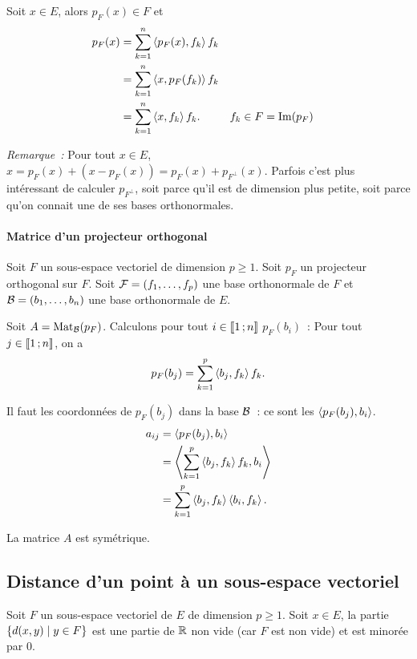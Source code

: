 Soit \(x \in E\), alors \(p_F(x) \in F\) et
\begin{align}
  p_F(x) &=\sum_{k=1}^n \left\langle{p_F(x)},{f_k}\right\rangle f_k \\
  &=\sum_{k=1}^n \left\langle{x},{p_F(f_k)}\right\rangle f_k \\
  &=\sum_{k=1}^n \left\langle{x},{f_k}\right\rangle f_k. && f_k \in F=\operatorname{Im}(p_F)
\end{align}

\emph{Remarque~:} Pour tout \(x \in E\), \(x = p_F(x) +(x-p_F(x)) = p_F(x) + p_{F^\perp}(x)\). Parfois c'est plus intéressant de calculer \(p_{F^\perp}\), soit parce qu'il est de dimension plus petite, soit parce qu'on connait une de ses bases orthonormales.

\paragraph{Matrice d'un projecteur orthogonal}
Soit \(F\) un sous-espace vectoriel de dimension \(p \geqslant 1\). Soit \(p_F\) un projecteur orthogonal sur \(F\). Soit \(\mathcal{F}=(f_1, \ldots, f_p)\) une base orthonormale de \(F\) et \(\mathcal{B}=(b_1, \ldots, b_n)\) une base orthonormale de \(E\).

Soit \(A=\mathrm{Mat}_{\mathcal{B}}(p_F)\). Calculons pour tout \(i \in \mathopen{\llbracket}1\mathclose{}\mathpunct{};n\mathclose{\rrbracket}\) \(p_F(b_i)\)~: Pour tout \(j \in \mathopen{\llbracket}1\mathclose{}\mathpunct{};n\mathclose{\rrbracket}\), on a
\begin{equation}
  p_F(b_j)=\sum_{k=1}^p \left\langle{b_j},{f_k}\right\rangle f_k.
\end{equation}

Il faut les coordonnées de \(p_F(b_j)\) dans la base \(\mathcal{B}\)~: ce sont les \(\left\langle{p_F(b_j)},{b_i}\right\rangle\).
\begin{align}
  a_{ij} &= \left\langle{p_F(b_j)},{b_i}\right\rangle \\
  &= \left\langle{\sum_{k=1}^p \left\langle{b_j},{f_k}\right\rangle f_k},{b_i}\right\rangle \\
  &= \sum_{k=1}^p \left\langle{b_j},{f_k}\right\rangle \left\langle{b_i},{f_k}\right\rangle.
\end{align}

La matrice \(A\) est symétrique.

\subsection{Distance d'un point à un sous-espace vectoriel}

Soit \(F\) un sous-espace vectoriel de \(E\) de dimension \(p \geqslant 1\). Soit \(x \in E\), la partie \(\left\{d(x,y)\mathrel{}\middle|\mathrel{}y \in F\right\}\) est une partie de \(\mathbb{R}\) non vide (car \(F\) est non vide) et est minorée par \(0\).

